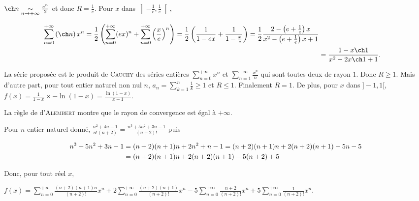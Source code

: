 {{\begin{center}
\end{center}
$\ch n\underset{n\rightarrow+\infty}{\sim}\frac{e^n}{2}$ et donc $R=\frac{1}{e}$.
Pour $x$ dans $\left]-\frac{1}{e},\frac{1}{e}\right[$,

\begin{align*}\ensuremath 
\sum_{n=0}^{+\infty}\left(\ch n\right)x^n=\frac{1}{2}\left(\sum_{n=0}^{+\infty}(ex)^n+\sum_{n=0}^{+\infty}\left(\frac{x}{e}\right)^n\right)=\frac{1}{2}\left(\frac{1}{1-ex}+\frac{1}{1-\frac{x}{e}}\right)=\frac{1}{2}\frac{2-\left(e+\frac{1}{e}\right)x}{x^2-\left(e+\frac{1}{e}\right)x+1}\\
 &=\frac{1-x\ch1}{x^2-2x\ch1+1}.
\end{align*}

\begin{center}
\fbox{
$\forall x\in\left]-\frac{1}{e},\frac{1}{e}\right[$, $\sum_{n=0}^{+\infty}\left(\ch n\right)x^n=\frac{1-x\ch1}{x^2-2x\ch1+1}$.
}
\end{center}
La série proposée est le produit de \textsc{Cauchy} des séries entières  $\sum_{n=0}^{+\infty}x^n$ et  $\sum_{n=1}^{+\infty}\frac{x^n}{n}$ qui sont toutes deux de rayon $1$. Donc $R\geqslant1$. Mais d'autre part, pour tout entier naturel non nul $n$, $a_n=\sum_{k=1}^{n}\frac{1}{k}\geqslant1$ et $R\leqslant1$. Finalement $R = 1$. De plus, pour $x$ dans $]-1,1[$, $f(x)=\frac{1}{1-x}\times-\ln(1-x)=\frac{\ln(1-x)}{x-1}$.

\begin{center}
\fbox{
$\forall x\in\left]-1,1\right[$, $\sum_{n=1}^{+\infty}\left(\sum_{k=1}^{n}\frac{1}{k}\right)x^n=\frac{\ln(1-x)}{x-1}$.
}
\end{center}
La règle de d'\textsc{Alembert} montre que le rayon de convergence est égal à $+\infty$.

Pour $n$ entier naturel donné, $\frac{n^2+4n-1}{n!(n+2)}=\frac{n^3+5n^2+3n-1}{(n+2)!}$ puis 

\begin{align*}\ensuremath
n^3+5n^2+3n-1&= (n+2)(n+1)n+2n^2+n-1 = (n+2)(n+1)n+2(n+2)(n+1) - 5n - 5\\
 &= (n+2)(n+1)n + 2(n+2)(n+1) - 5(n+2) + 5
\end{align*}

Donc, pour tout réel $x$,

\begin{center}
$f(x) =\sum_{n=0}^{+\infty}\frac{(n+2)(n+1)n}{(n+2)!}x^n +2\sum_{n=0}^{+\infty}\frac{(n+2)(n+1)}{(n+2)!}x^n- 5\sum_{n=0}^{+\infty}\frac{n+2}{(n+2)!}x^n+ 5\sum_{n=0}^{+\infty}\frac{1}{(n+2)!}x^n.$
\end{center}

}}
